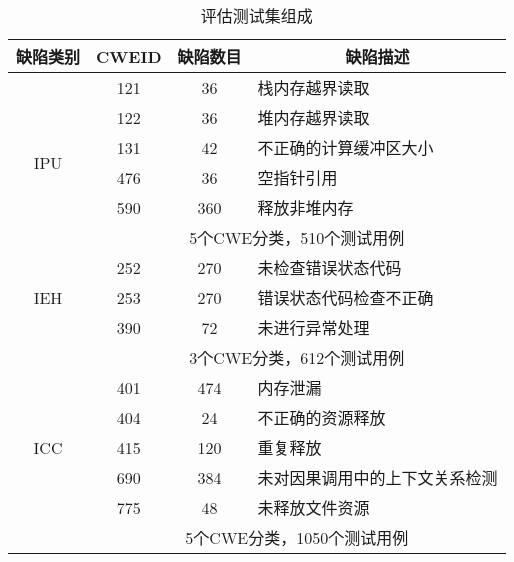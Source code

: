 \begin{table}[t]
	\centering
	\begin{minipage}[t]{0.8\linewidth} %
		\caption{评估测试集组成}
		\label{tab:3-4-cwe}
		\begin{tabular}{cccl}
			\hline
			{缺陷类别 } & {CWEID} & 缺陷数目 & \multicolumn{1}{c}{缺陷描述} \\
			\hline
			\multirow{6}{*}{IPU} & 121 & 36 & 栈内存越界读取\\
			& 122 & 36 & 堆内存越界读取 \\
			& 131 & 42 & 不正确的计算缓冲区大小\\
			& 476 & 36 & 空指针引用\\
			& 590 & 360 & 释放非堆内存\\
			& \multicolumn{3}{c}{5个CWE分类，510个测试用例} \\
			\hline
			\multirow{3}{*}{IEH} & 252 & 270 & 未检查错误状态代码\\
			& 253 & 270 & 错误状态代码检查不正确\\
			& 390 & 72 & 未进行异常处理\\
			& \multicolumn{3}{c}{3个CWE分类，612个测试用例} \\
			\hline
			\multirow{5}{*}{ICC} & 401 & 474 & 内存泄漏\\
			& 404 & 24 & 不正确的资源释放\\
			& 415 & 120 & 重复释放\\
			& 690 & 384 & 未对因果调用中的上下文关系检测\\
			& 775 & 48 & 未释放文件资源\\
			& \multicolumn{3}{c}{5个CWE分类，1050个测试用例} \\
			\hline
		\end{tabular}
	\end{minipage}
\end{table}
